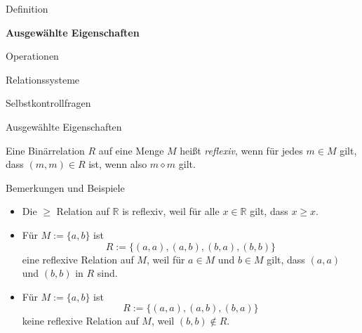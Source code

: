 \documentclass[
  8pt,
  ignorenonframetext,
]{beamer}
\providecommand{\tightlist}{%
  \setlength{\itemsep}{0pt}\setlength{\parskip}{0pt}}
\begin{document}
\begin{frame}{}
\protect\hypertarget{section-4}{}
\vfill
\Large

Definition

\textbf{Ausgewählte Eigenschaften}

Operationen

Relationssysteme

Selbstkontrollfragen \vfill
\end{frame}

\begin{frame}{Ausgewählte Eigenschaften}
\protect\hypertarget{ausgewuxe4hlte-eigenschaften}{}
\small
\begin{definition}[Reflexivität]
\justifying
Eine Binärrelation $R$ auf eine Menge $M$ heißt \textit{reflexiv}, wenn für
jedes $m \in M$ gilt, dass $(m,m)\in R$ ist, wenn also $m \diamond m$ gilt.
\end{definition}

\footnotesize

Bemerkungen und Beispiele

\begin{itemize}
\tightlist
\item
  Die \(\ge\) Relation auf \(\mathbb{R}\) is reflexiv, weil für alle
  \(x \in \mathbb{R}\) gilt, dass \(x \ge x\).
\item
  Für \(M := \{a,b\}\) ist \begin{equation}
  R := \{(a,a), (a,b), (b,a), (b,b)\}
  \end{equation} eine reflexive Relation auf \(M\), weil für \(a \in M\)
  und \(b \in M\) gilt, dass \((a,a)\) und \((b,b)\) in \(R\) sind.
\item
  Für \(M := \{a,b\}\) ist \begin{equation}
  R := \{(a,a), (a,b), (b,a)\}
  \end{equation} keine reflexive Relation auf \(M\), weil
  \((b,b)\notin R\).
\end{itemize}
\end{frame}
\end{document}
